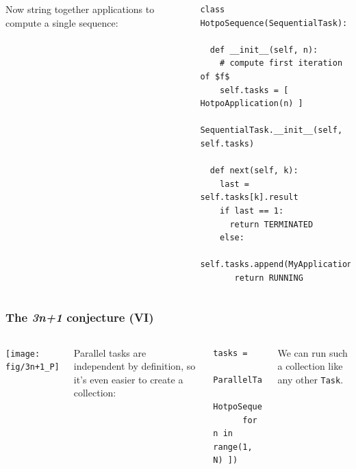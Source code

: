 \documentclass[english,serif,mathserif,xcolor=pdftex,dvipsnames,table]{beamer}
\begin{document}
\begin{frame}[fragile]
\begin{columns}
  Now string together applications to compute a
  single sequence:
\begin{lstlisting}
class HotpoSequence(SequentialTask):

  def __init__(self, n):
    # compute first iteration of $f$
    self.tasks = [ HotpoApplication(n) ]
    SequentialTask.__init__(self, self.tasks)

  def next(self, k):
    last = self.tasks[k].result
    if last == 1:
      return TERMINATED
    else:
      self.tasks.append(MyApplication(last)
       return RUNNING
\end{lstlisting}
  \end{columns}
\end{frame}

\begin{frame}[fragile]
  \frametitle{The \emph{3n+1} conjecture (VI)}
  \label{sec:15}

  \begin{columns}
    \begin{center}
      \texttt{[image: fig/3n+1\_P]}
    \end{center}

    Parallel tasks are independent by definition, so it's even easier to
    create a collection:
\begin{lstlisting}
tasks =
  ParallelTaskCollection([
    HotpoSequence(n)
      for n in range(1, N) ])
\end{lstlisting}

    We can run such a collection like any other \texttt{Task}.
  \end{columns}
\end{frame}
\end{document}
